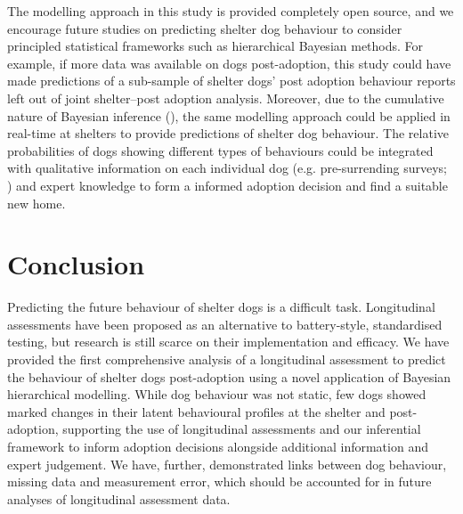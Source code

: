 \documentclass[12pt]{article}
\begin{document}
The modelling approach in this study is provided completely open source, and we encourage future studies on predicting shelter dog behaviour to consider principled statistical frameworks such as hierarchical Bayesian methods. For example, if more data was available on dogs post-adoption, this study could have made predictions of a sub-sample of shelter dogs' post adoption behaviour reports left out of joint shelter--post adoption analysis. Moreover, due to the cumulative nature of Bayesian inference (\cite{mcelreath2020}), the same modelling approach could be applied in real-time at shelters to provide predictions of shelter dog behaviour. The relative probabilities of dogs showing different types of behaviours could be integrated with qualitative information on each individual dog (e.g. pre-surrending surveys; \cite{ASPCA2018}) and expert knowledge to form a informed adoption decision and find a suitable new home.

\section{Conclusion}
Predicting the future behaviour of shelter dogs is a difficult task. Longitudinal assessments have been proposed as an alternative to battery-style, standardised testing, but research is still scarce on their implementation and efficacy. We have provided the first comprehensive analysis of a longitudinal assessment to predict the behaviour of shelter dogs post-adoption using a novel application of Bayesian hierarchical modelling. While dog behaviour was not static, few dogs showed marked changes in their latent behavioural profiles at the shelter and post-adoption, supporting the use of longitudinal assessments and our inferential framework to inform adoption decisions alongside additional information and expert judgement. We have, further, demonstrated links between dog behaviour, missing data and measurement error, which should be accounted for in future analyses of longitudinal assessment data.


\newpage
\printbibliography
\end{document}
